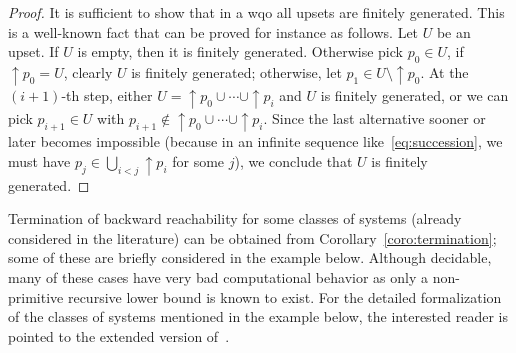 \documentclass{LMCS}
\theoremstyle{plain}\newtheorem{assumption}[thm]{Assumption}
\theoremstyle{plain}\newtheorem{proposition}[thm]{Proposition}
\theoremstyle{plain}\newtheorem{property}[thm]{Property}
\theoremstyle{plain}\newtheorem{example}[thm]{Example}
\theoremstyle{plain}\newtheorem{claim}[thm]{Claim}
\theoremstyle{plain}\newtheorem{lemma}[thm]{Lemma}
\begin{document}
\begin{proof}
  It is sufficient to show that in a wqo all upsets are finitely
  generated.  This is a well-known fact that can be proved for
  instance as follows.  Let $U$ be an upset.  If $U$ is empty, then it
  is finitely generated.  Otherwise pick $p_0\in U$, if $\uparrow\!
  p_0=U$, clearly $U$ is finitely generated; otherwise, let $p_1\in U
  \setminus\uparrow p_0$. At the $(i+1)$-th step, either $U=\uparrow\!
  p_0\cup\cdots \cup \uparrow\! p_i$ and $U$ is finitely generated, or
  we can pick $p_{i+1}\in U$ with $p_{i+1}\not \in \uparrow\!
  p_0\cup\cdots \cup \uparrow\! p_i$. Since the last alternative
  sooner or later becomes impossible (because in an infinite sequence
  like~\eqref{eq:succession}, we must have $p_j\in\bigcup_{i<j}
  \uparrow\! p_i$ for some $j$), we conclude that $U$ is finitely
  generated.
\end{proof}
Termination of backward reachability for some classes of systems
(already considered in the literature) can be obtained from
Corollary~\ref{coro:termination}; some of these are briefly considered
in the example below.  Although decidable, many of these cases have
very bad computational behavior as only a non-primitive recursive
lower bound is known to exist.  For the detailed formalization of the
classes of systems mentioned in the example below, the interested
reader is pointed to the extended version of~\cite{ijcar08}.
\end{document}

